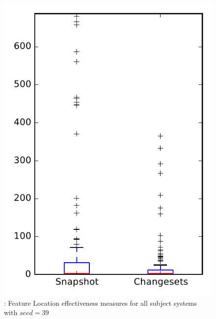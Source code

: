 
\begin{figure}
\centering
\includegraphics[height=0.4\textheight]{figures/flt_seed/rq1_overview_39}
\caption{\rone: Feature Location effectiveness measures for all subject systems with $seed=39$}
\label{fig:flt_seed:rq1:overview}
\end{figure}
